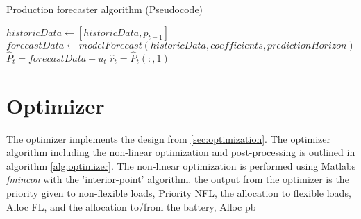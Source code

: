 \begin{algorithm}
\caption{Production forecaster algorithm (Pseudocode)}\label{alg:prod_forecast}
\begin{algorithmic}
    
  
    \State$historicData \gets [historicData,p_{t-1}]$
    \State$forecastData \gets modelForecast(historicData,coefficients,predictionHorizon)$
\EndIf\\
    \State$\hat{P}_t = forecastData + u_t $
    \State$\hat{r}_t = \hat{P}_t(:,1)$  
\end{algorithmic}
\end{algorithm}



\section{Optimizer}
The optimizer implements the design from \ref{sec:optimization}. The optimizer algorithm including the non-linear optimization and post-processing is outlined in algorithm \ref{alg:optimizer}. The non-linear optimization is performed using Matlabs \textit{fmincon} with the 'interior-point' algorithm. the output from the optimizer is the priority given to non-flexible loads, Priority NFL, the allocation to flexible loads, Alloc FL, and the allocation to/from the battery, Alloc pb

